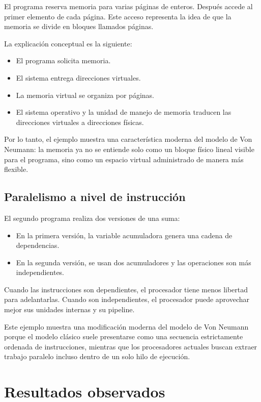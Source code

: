 \documentclass[11pt,a4paper]{article}
\begin{document}
El programa reserva memoria para varias páginas de enteros. Después accede al primer elemento de cada página. Este acceso representa la idea de que la memoria se divide en bloques llamados páginas.

La explicación conceptual es la siguiente:

\begin{itemize}
\item El programa solicita memoria.
\item El sistema entrega direcciones virtuales.
\item La memoria virtual se organiza por páginas.
\item El sistema operativo y la unidad de manejo de memoria traducen las direcciones virtuales a direcciones físicas.
\end{itemize}

Por lo tanto, el ejemplo muestra una característica moderna del modelo de Von Neumann: la memoria ya no se entiende solo como un bloque físico lineal visible para el programa, sino como un espacio virtual administrado de manera más flexible.

\subsection{Paralelismo a nivel de instrucción}

El segundo programa realiza dos versiones de una suma:

\begin{itemize}
\item En la primera versión, la variable acumuladora genera una cadena de dependencias.
\item En la segunda versión, se usan dos acumuladores y las operaciones son más independientes.
\end{itemize}

Cuando las instrucciones son dependientes, el procesador tiene menos libertad para adelantarlas. Cuando son independientes, el procesador puede aprovechar mejor sus unidades internas y su pipeline.

Este ejemplo muestra una modificación moderna del modelo de Von Neumann porque el modelo clásico suele presentarse como una secuencia estrictamente ordenada de instrucciones, mientras que los procesadores actuales buscan extraer trabajo paralelo incluso dentro de un solo hilo de ejecución.

\section{Resultados observados}
\end{document}
